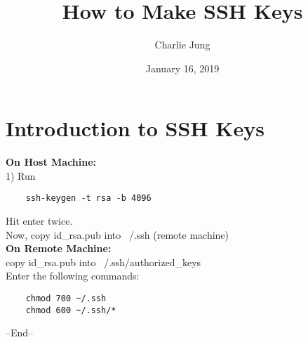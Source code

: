 \documentclass{article}
\title{How to Make SSH Keys}
\author{Charlie Jung}
\date{January 16, 2019}
\begin{document}
\maketitle

\section{Introduction to SSH Keys}

\textbf{On Host Machine:}
\\
1) Run 
\\
\begin{verbatim}
    ssh-keygen -t rsa -b 4096
\end{verbatim}
Hit enter twice.
\\
Now, copy id\_rsa.pub into ~/.ssh (remote machine)
\bigskip
\\
\textbf{On Remote Machine:}
\\
copy id\_rsa.pub into ~/.ssh/authorized\_keys
\\
Enter the following commands:
\begin{verbatim}
    chmod 700 ~/.ssh
    chmod 600 ~/.ssh/*
\end{verbatim}

--End--
\end{document}
